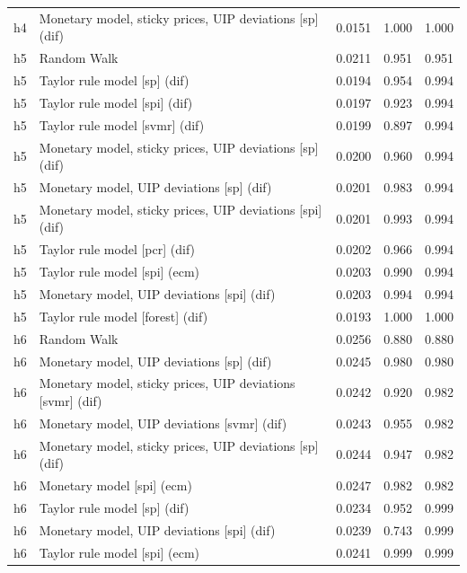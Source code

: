 \begin{ThreePartTable}
\begin{longtable}[t]{cp{5.5cm}ccc}
h4 & \raggedright Monetary model, sticky prices, UIP deviations [sp] (dif) & 0.0151 & 1.000 & 1.000\\
\addlinespace
h5 & \raggedright Random Walk & 0.0211 & 0.951 & 0.951\\
h5 & \raggedright Taylor rule model [sp] (dif) & 0.0194 & 0.954 & 0.994\\
h5 & \raggedright Taylor rule model [spi] (dif) & 0.0197 & 0.923 & 0.994\\
h5 & \raggedright Taylor rule model [svmr] (dif) & 0.0199 & 0.897 & 0.994\\
h5 & \raggedright Monetary model, sticky prices, UIP deviations [sp] (dif) & 0.0200 & 0.960 & 0.994\\
h5 & \raggedright Monetary model, UIP deviations [sp] (dif) & 0.0201 & 0.983 & 0.994\\
h5 & \raggedright Monetary model, sticky prices, UIP deviations [spi] (dif) & 0.0201 & 0.993 & 0.994\\
h5 & \raggedright Taylor rule model [pcr] (dif) & 0.0202 & 0.966 & 0.994\\
h5 & \raggedright Taylor rule model [spi] (ecm) & 0.0203 & 0.990 & 0.994\\
h5 & \raggedright Monetary model, UIP deviations [spi] (dif) & 0.0203 & 0.994 & 0.994\\
h5 & \raggedright Taylor rule model [forest] (dif) & 0.0193 & 1.000 & 1.000\\
\addlinespace
h6 & \raggedright Random Walk & 0.0256 & 0.880 & 0.880\\
h6 & \raggedright Monetary model, UIP deviations [sp] (dif) & 0.0245 & 0.980 & 0.980\\
h6 & \raggedright Monetary model, sticky prices, UIP deviations [svmr] (dif) & 0.0242 & 0.920 & 0.982\\
h6 & \raggedright Monetary model, UIP deviations [svmr] (dif) & 0.0243 & 0.955 & 0.982\\
h6 & \raggedright Monetary model, sticky prices, UIP deviations [sp] (dif) & 0.0244 & 0.947 & 0.982\\
h6 & \raggedright Monetary model [spi] (ecm) & 0.0247 & 0.982 & 0.982\\
h6 & \raggedright Taylor rule model [sp] (dif) & 0.0234 & 0.952 & 0.999\\
h6 & \raggedright Monetary model, UIP deviations [spi] (dif) & 0.0239 & 0.743 & 0.999\\
h6 & \raggedright Taylor rule model [spi] (ecm) & 0.0241 & 0.999 & 0.999\\

\end{longtable}
\end{ThreePartTable}

